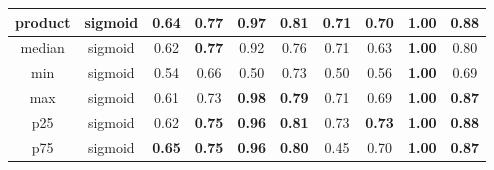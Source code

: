 \begin{table*}[!b]
\begin{tabular}{|c|c|c|c|c|c|c|c|c|c|}
        \hline
                product &         sigmoid &                \textbf{0.64} &                \textbf{0.77} &             \textbf{0.97} &            \textbf{0.81} &                    0.71 &                    0.70 &          \textbf{1.00} &                \textbf{0.88} \\
        \hline
                 median &         sigmoid &                         0.62 &                \textbf{0.77} &                      0.92 &                     0.76 &                    0.71 &                    0.63 &          \textbf{1.00} &                         0.80 \\
        \hline
                    min &         sigmoid &                         0.54 &                         0.66 &                      0.50 &                     0.73 &                    0.50 &                    0.56 &          \textbf{1.00} &                         0.69 \\
        \hline
                    max &         sigmoid &                         0.61 &                         0.73 &             \textbf{0.98} &            \textbf{0.79} &                    0.71 &                    0.69 &          \textbf{1.00} &                \textbf{0.87} \\
        \hline
                    p25 &         sigmoid &                         0.62 &                \textbf{0.75} &             \textbf{0.96} &            \textbf{0.81} &                    0.73 &           \textbf{0.73} &          \textbf{1.00} &                \textbf{0.88} \\
        \hline
                    p75 &         sigmoid &                \textbf{0.65} &                \textbf{0.75} &             \textbf{0.96} &            \textbf{0.80} &                    0.45 &                    0.70 &          \textbf{1.00} &                \textbf{0.87} \\
        \hline
    \end{tabular}
\end{table*}


